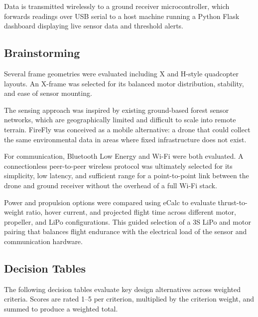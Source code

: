 \documentclass[journal, onecolumn]{IEEEtran}
\begin{document}
\vspace{0.5em}

Data is transmitted wirelessly to a ground receiver microcontroller, which forwards readings over USB serial to a host machine running a Python Flask dashboard displaying live sensor data and threshold alerts.

\subsection{Brainstorming}
Several frame geometries were evaluated including X and H-style quadcopter
layouts. An X-frame was selected for its balanced motor distribution,
stability, and ease of sensor mounting.

\vspace{0.5em}

The sensing approach was inspired by existing ground-based forest sensor
networks, which are geographically limited and difficult to scale into remote
terrain. FireFly was conceived as a mobile alternative: a drone that could
collect the same environmental data in areas where fixed infrastructure does
not exist.

\vspace{0.5em}

For communication, Bluetooth Low Energy and Wi-Fi were both evaluated. A connectionless peer-to-peer wireless protocol was ultimately selected for its simplicity, low latency, and sufficient range for a point-to-point link between the drone and ground receiver without the overhead of a full Wi-Fi stack.

\vspace{0.5em}

Power and propulsion options were compared using eCalc to evaluate
thrust-to-weight ratio, hover current, and projected flight time across
different motor, propeller, and LiPo configurations. This guided selection
of a 3S LiPo and motor pairing that balances flight endurance with the
electrical load of the sensor and communication hardware.

\subsection{Decision Tables}

The following decision tables evaluate key design alternatives across weighted criteria. Scores are rated 1--5 per criterion, multiplied by the criterion weight, and summed to produce a weighted total.
\end{document}
